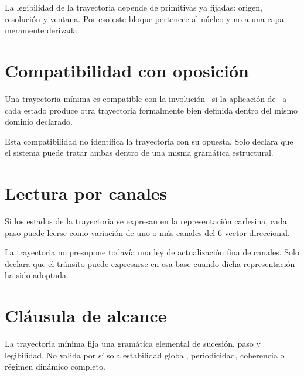 \begin{observation}
La legibilidad de la trayectoria depende de primitivas ya fijadas: origen, resolución y ventana. Por eso este bloque pertenece al núcleo y no a una capa meramente derivada.
\end{observation}

\section{Compatibilidad con oposición}
\begin{definition}
Una trayectoria mínima es compatible con la involución \Iop\ si la aplicación de \Iop\ a cada estado produce otra trayectoria formalmente bien definida dentro del mismo dominio declarado.
\end{definition}

\begin{observation}
Esta compatibilidad no identifica la trayectoria con su opuesta. Solo declara que el sistema puede tratar ambas dentro de una misma gramática estructural.
\end{observation}

\section{Lectura por canales}
\begin{definition}
Si los estados de la trayectoria se expresan en la representación carlesina, cada paso puede leerse como variación de uno o más canales del 6-vector direccional.
\end{definition}

\begin{observation}
La trayectoria no presupone todavía una ley de actualización fina de canales. Solo declara que el tránsito puede expresarse en esa base cuando dicha representación ha sido adoptada.
\end{observation}

\section{Cláusula de alcance}
\begin{observation}
La trayectoria mínima fija una gramática elemental de sucesión, paso y legibilidad. No valida por sí sola estabilidad global, periodicidad, coherencia o régimen dinámico completo.
\end{observation}

